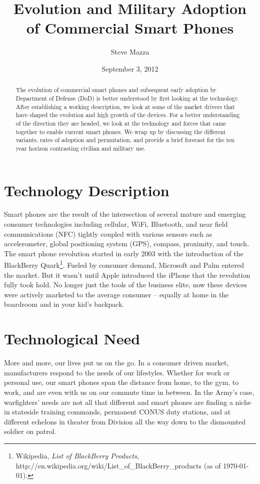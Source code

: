 \documentclass[letterpaper,12pt]{article}
\title{Evolution and Military Adoption \\ of Commercial Smart Phones}
\author{Steve Mazza}
\date{September 3, 2012}
\begin{document}
\maketitle

\begin{abstract}
The evolution of commercial smart phones and subsequent early adoption by Department of Defense (DoD) is better understood by first looking at the technology.  After establishing a working description, we look at some of the market drivers that have shaped the evolution and high growth of the devices.  For a better understanding of the direction they are headed, we look at the technology and forces that came together to enable current smart phones.  We wrap up by discussing the different variants, rates of adoption and permutation, and provide a brief forecast for the ten year horizon contrasting civilian and military use.
\end{abstract}

\section*{Technology Description}
Smart phones are the result of the intersection of several mature and emerging consumer technologies including cellular, WiFi, Bluetooth, and near field communications (NFC) tightly coupled with various sensors such as accelerometer, global positioning system (GPS), compass, proximity, and touch.  The smart phone revolution started in early 2003 with the introduction of the BlackBerry Quark\footnote{Wikipedia, \emph{List of BlackBerry Products}, http://en.wikipedia.org/wiki/List\_of\_BlackBerry\_products (as of \today).}.  Fueled by consumer demand, Microsoft and Palm entered the market.  But it wasn't until Apple introduced the iPhone that the revolution fully took hold.  No longer just the tools of the business elite, now these devices were actively marketed to the average consumer -- equally at home in the boardroom and in your kid's backpack.

\section*{Technological Need}
More and more, our lives put us on the go.  In a consumer driven market, manufacturers respond to the needs of our lifestyles.  Whether for work or personal use, our smart phones span the distance from home, to the gym, to work, and are even with us on our commute time in between.  In the Army's case, warfighters' needs are not all that different and smart phones are finding a niche in stateside training commands, permanent CONUS duty stations, and at different echelons in theater from Division all the way down to the dismounted soldier on patrol.  
\end{document}
